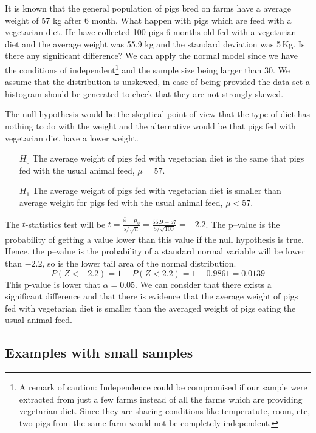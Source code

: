   
\begin{examplewrap}
\begin{nexample}{It is known that the general population of pigs bred on farms have a
average weight of 57 kg after 6 month. What happen with pigs which are
feed with a vegetarian diet. He have collected 100 pigs 6 months-old fed
with a vegetarian diet and the average weight was 55.9 kg and the
standard deviation was 5\,Kg. Is there any significant difference? }
We can apply the normal model since we have the conditions of independent\footnote{A  remark of caution: Independence could be compromised if our sample were extracted from just a few farms instead of all the farms which are providing vegetarian diet. Since they are sharing conditions like temperatute, room, etc, two pigs from the same farm would not be completely  independent. } and the sample size being larger than 30. We assume that the distribution is unskewed, in case of being provided the  data set a histogram should be generated to check that they are not strongly skewed. 

The null hypothesis would be the skeptical point of view that the type of diet has nothing to do with the weight and the alternative would be that pigs fed with vegetarian diet have a lower weight.
\begin{itemize}
\item[$H_0$] The average weight of pigs fed with vegetarian diet is the same that pigs fed with the usual animal feed, $\mu=57$.
\item[$H_1$] The average  weight of pigs fed with vegetarian diet is smaller than average weight for pigs fed with the usual animal feed, $\mu<57$.  
\end{itemize}
The $t$-statistics test will be $t=\frac{\bar{x}-\mu_0}{s/\sqrt{n}}=\frac{55.9-57}{5/\sqrt{100}}=-2.2$. The p--value is the probability of getting a value lower than this value if the null hypothesis is true. Hence, the p--value is the probability of a standard normal variable will be lower than $-2.2$, so is the lower tail area of the normal distribution. 
$$P(Z<-2.2)=1-P(Z<2.2)=1-0.9861=0.0139$$ 
This p-value is lower that $\alpha=0.05$. We can consider that there exists a significant difference and that there is evidence that the average weight of pigs fed with vegetarian diet is smaller than the averaged weight of pigs eating the usual animal feed.
\end{nexample}
\end{examplewrap}

      \subsection{Examples with small samples}
      
